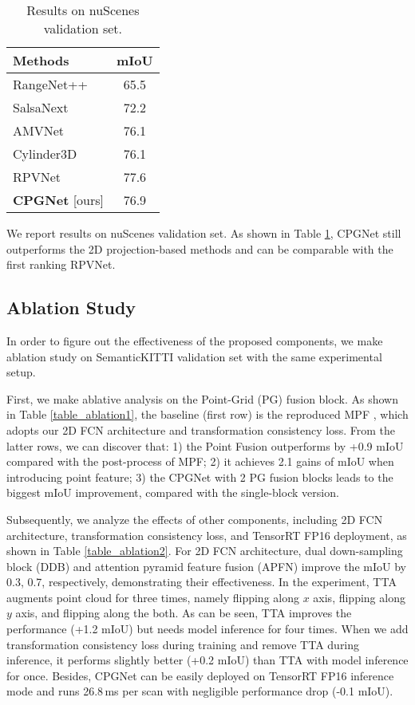 \documentclass[letterpaper, 10 pt, conference]{ieeeconf}
\begin{document}
\begin{table}[t]
\caption{Results on nuScenes validation set.}
\label{table_nuscenes}
\begin{center}
\begin{tabular}{l|c}
\hline
{\bf Methods} & {\bf mIoU} \\

\hline
RangeNet++ \cite{milioto2019rangenetplus} & 65.5 \\
SalsaNext \cite{cortinhal2020salsanext} & 72.2 \\
AMVNet \cite{liong2020amvnet} & 76.1 \\
Cylinder3D \cite{zhu2021cylindrical} & 76.1 \\
RPVNet \cite{xu2021rpvnet} & 77.6 \\

\hline
{\bf CPGNet} [ours] & 76.9 \\
\hline
\end{tabular}
\end{center}
\end{table}

We report results on nuScenes validation set. As shown in Table \ref{table_nuscenes}, CPGNet still outperforms the 2D projection-based methods and can be comparable with the first ranking RPVNet.

\subsection{Ablation Study}
In order to figure out the effectiveness of the proposed components, we make ablation study on SemanticKITTI validation set with the same experimental setup.

First, we make ablative analysis on the Point-Grid (PG) fusion block. As shown in Table \ref{table_ablation1}, the baseline (first row) is the reproduced MPF \cite{alnaggar2021multi}, which adopts our 2D FCN architecture and transformation consistency loss. From the latter rows, we can discover that: 1) the Point Fusion outperforms by +0.9 mIoU compared with the post-process of MPF; 2) it achieves 2.1 gains of mIoU when introducing point feature; 3) the CPGNet with 2 PG fusion blocks leads to the biggest mIoU improvement, compared with the single-block version.

Subsequently, we analyze the effects of other components, including 2D FCN architecture, transformation consistency loss, and TensorRT FP16 deployment, as shown in Table \ref{table_ablation2}. For 2D FCN architecture, dual down-sampling block (DDB) and attention pyramid feature fusion (APFN) improve the mIoU by 0.3, 0.7, respectively, demonstrating their effectiveness. In the experiment, TTA augments point cloud for three times, namely flipping along $x$ axis, flipping along $y$ axis, and flipping along the both. As can be seen, TTA improves the performance (+1.2 mIoU) but needs model inference for four times. When we add transformation consistency loss during training and remove TTA during inference, it performs slightly better (+0.2 mIoU) than TTA with model inference for once. Besides, CPGNet can be easily deployed on TensorRT FP16 inference mode and runs 26.8\,ms per scan with negligible performance drop (-0.1 mIoU).
\end{document}
